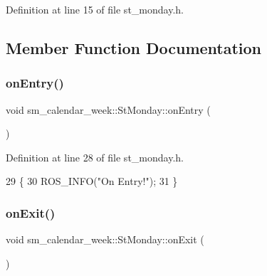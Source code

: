 Definition at line 15 of file st\+\_\+monday.\+h.



\subsection{Member Function Documentation}
\mbox{\label{structsm__calendar__week_1_1StMonday_a6a64482ecac73d7c7b7304e9c27d0119}} 
\subsubsection{\texorpdfstring{on\+Entry()}{onEntry()}}
{\footnotesize\ttfamily void sm\+\_\+calendar\+\_\+week\+::\+St\+Monday\+::on\+Entry (\begin{DoxyParamCaption}{ }\end{DoxyParamCaption})\hspace{0.3cm}{\ttfamily [inline]}}



Definition at line 28 of file st\+\_\+monday.\+h.


\begin{DoxyCode}
29     \{
30         ROS\_INFO(\textcolor{stringliteral}{"On Entry!"});
31     \}
\end{DoxyCode}
\mbox{\label{structsm__calendar__week_1_1StMonday_a3c53bed49c8e977e8189fd630d62f516}} 
\subsubsection{\texorpdfstring{on\+Exit()}{onExit()}}
{\footnotesize\ttfamily void sm\+\_\+calendar\+\_\+week\+::\+St\+Monday\+::on\+Exit (\begin{DoxyParamCaption}{ }\end{DoxyParamCaption})\hspace{0.3cm}{\ttfamily [inline]}}



